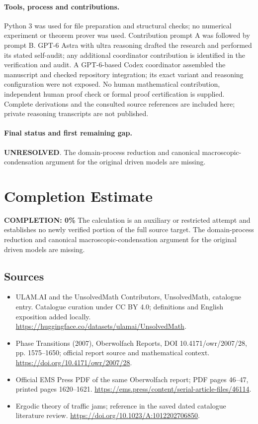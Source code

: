 \documentclass[11pt]{article}
\begin{document}
\paragraph{Tools, process and contributions.}
Python 3 was used for file preparation and structural checks; no numerical experiment or theorem prover was used. Contribution prompt A was followed by prompt B. GPT-6 Astra with ultra reasoning drafted the research and performed its stated self-audit; any additional coordinator contribution is identified in the verification and audit. A GPT-6-based Codex coordinator assembled the manuscript and checked repository integration; its exact variant and reasoning configuration were not exposed. No human mathematical contribution, independent human proof check or formal proof certification is supplied. Complete derivations and the consulted source references are included here; private reasoning transcripts are not published.

\paragraph{Final status and first remaining gap.}
\textbf{UNRESOLVED}. The domain-process reduction and canonical macroscopic-condensation argument for the original driven models are missing.

\section{Completion Estimate}
\noindent\textbf{COMPLETION: 0\%}
The calculation is an auxiliary or restricted attempt and establishes no newly verified portion of the full source target. The domain-process reduction and canonical macroscopic-condensation argument for the original driven models are missing.

\subsection{Sources}
\begin{itemize}
\item[\hypertarget{source:statement:1}{S1}] ULAM.AI and the UnsolvedMath Contributors, UnsolvedMath, catalogue entry. Catalogue curation under CC BY 4.0; definitions and English exposition added locally.
\url{https://huggingface.co/datasets/ulamai/UnsolvedMath}.
\item[\hypertarget{source:statement:2}{S2}] Phase Transitions (2007), Oberwolfach Reports, DOI 10.4171/owr/2007/28, pp. 1575--1650; official report source and mathematical context.
\url{https://doi.org/10.4171/owr/2007/28}.
\item[\hypertarget{source:statement:3}{S3}] Official EMS Press PDF of the same Oberwolfach report; PDF pages 46--47, printed pages 1620--1621.
\url{https://ems.press/content/serial-article-files/46114}.
\item[\hypertarget{source:statement:4}{S4}] Ergodic theory of traffic jams; reference in the saved dated catalogue literature review.
\url{https://doi.org/10.1023/A:1012202706850}.
\end{itemize}
\label{end:statement}
\end{document}
